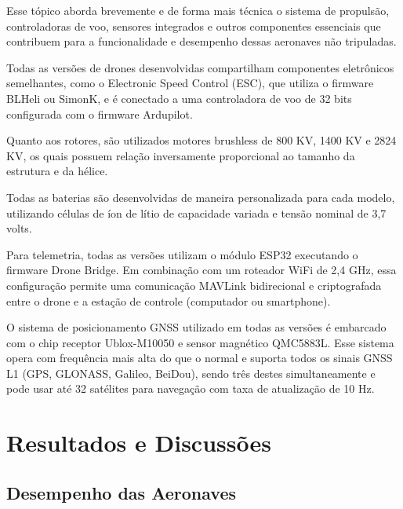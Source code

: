 \documentclass[conference]{IEEEtran}
\begin{document}
Esse tópico aborda brevemente e de forma mais técnica o sistema de propulsão, controladoras de voo, sensores integrados e outros componentes essenciais que contribuem para a funcionalidade e desempenho dessas aeronaves não tripuladas.

Todas as versões de drones desenvolvidas compartilham componentes eletrônicos semelhantes, como o Electronic Speed Control (ESC), que utiliza o firmware BLHeli ou SimonK, e é conectado a uma controladora de voo de 32 bits configurada com o firmware Ardupilot.

Quanto aos rotores, são utilizados motores brushless de 800 KV, 1400 KV e 2824 KV, os quais possuem relação inversamente proporcional ao tamanho da estrutura e da hélice.

Todas as baterias são desenvolvidas de maneira personalizada para cada modelo, utilizando células de íon de lítio de capacidade variada e tensão nominal de 3,7 volts.

Para telemetria, todas as versões utilizam o módulo ESP32 executando o firmware Drone Bridge. Em combinação com um roteador WiFi de 2,4 GHz, essa configuração permite uma comunicação MAVLink bidirecional e criptografada entre o drone e a estação de controle (computador ou smartphone).

O sistema de posicionamento GNSS utilizado em todas as versões é embarcado com o chip receptor Ublox-M10050 e sensor magnético QMC5883L. Esse sistema opera com frequência mais alta do que o normal e suporta todos os sinais GNSS L1 (GPS, GLONASS, Galileo, BeiDou), sendo três destes simultaneamente e pode usar até 32 satélites para navegação com taxa de atualização de 10 Hz.

\section{Resultados e Discussões}

\subsection{Desempenho das Aeronaves}
\end{document}
